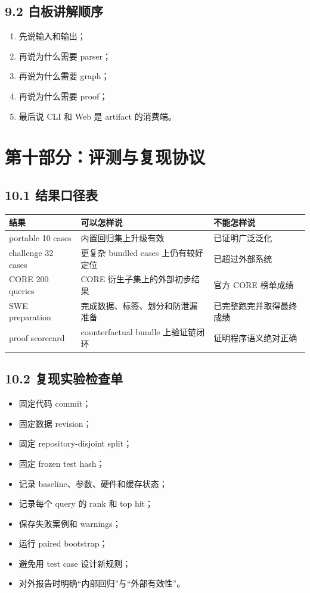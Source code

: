 \documentclass[UTF8,12pt,openany]{ctexbook}
\begin{document}
\section{9.2 白板讲解顺序}

\begin{enumerate}
\item 先说输入和输出；
\item 再说为什么需要 parser；
\item 再说为什么需要 graph；
\item 再说为什么需要 proof；
\item 最后说 CLI 和 Web 是 artifact 的消费端。
\end{enumerate}

\clearpage
\chapter{第十部分：评测与复现协议}

\section{10.1 结果口径表}

\begin{center}
\small
\begin{longtable}{|p{}|p{}|p{}|}
\toprule
结果 & 可以怎样说 & 不能怎样说 \\
\midrule
portable 10 cases & 内置回归集上升级有效 & 已证明广泛泛化 \\
challenge 32 cases & 更复杂 bundled cases 上仍有较好定位 & 已超过外部系统 \\
CORE 200 queries & CORE 衍生子集上的外部初步结果 & 官方 CORE 榜单成绩 \\
SWE preparation & 完成数据、标签、划分和防泄漏准备 & 已完整跑完并取得最终成绩 \\
proof scorecard & counterfactual bundle 上验证链闭环 & 证明程序语义绝对正确 \\
\bottomrule
\end{longtable}
\end{center}

\section{10.2 复现实验检查单}

\begin{itemize}
\item 固定代码 commit；
\item 固定数据 revision；
\item 固定 repository-disjoint split；
\item 固定 frozen test hash；
\item 记录 baseline、参数、硬件和缓存状态；
\item 记录每个 query 的 rank 和 top hit；
\item 保存失败案例和 warnings；
\item 运行 paired bootstrap；
\item 避免用 test case 设计新规则；
\item 对外报告时明确“内部回归”与“外部有效性”。
\end{itemize}
\end{document}
